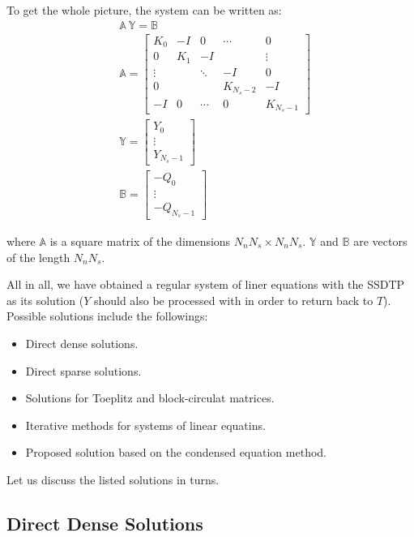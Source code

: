 To get the whole picture, the system can be written as:
\begin{align}
  & \mathbb{A} \: \mathbb{Y} = \mathbb{B} \label{eq:system} \\
  & \mathbb{A} = \left[
    \begin{array}{ccccc}
      K_0 & -I & 0 & \cdots & 0 \\
      0 & K_1 & -I &  & \vdots \\
      \vdots &  & \ddots & -I & 0 \\
      0 &  &  & K_{N_s - 2} & -I \\
      -I & 0 & \cdots & 0 & K_{N_s - 1}
    \end{array}
  \right] \nonumber \\
  & \mathbb{Y} = \left[
    \begin{array}{c}
      Y_0 \\
      \vdots \\
      Y_{N_s - 1}
    \end{array}
  \right] \nonumber \\
  & \mathbb{B} = \left[
    \begin{array}{c}
      -Q_0 \\
      \vdots \\
      -Q_{N_s - 1}
    \end{array}
  \right] \nonumber
\end{align}

where $\mathbb{A}$ is a square matrix of the dimensions $N_n N_s \times N_n N_s$. $\mathbb{Y}$ and $\mathbb{B}$ are vectors of the length $N_n N_s$.

All in all, we have obtained a regular system of liner equations with the SSDTP as its solution ($Y$ should also be processed with  in order to return back to $T$). Possible solutions include the followings:
\begin{itemize}
  \item Direct dense solutions.
  \item Direct sparse solutions.
  \item Solutions for Toeplitz and block-circulat matrices.
  \item Iterative methods for systems of linear equatins.
  \item Proposed solution based on the condensed equation method.
\end{itemize}
Let us discuss the listed solutions in turns.

\subsection{Direct Dense Solutions}


